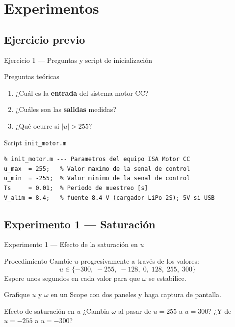 \documentclass{beamer}
\begin{document}
\section{Experimentos}

\subsection{Ejercicio previo}

\begin{frame}[fragile]{Ejercicio 1 --- Preguntas y script de inicialización}
\begin{block}{Preguntas teóricas}
  \begin{enumerate}
    \item ¿Cuál es la \textbf{entrada} del sistema motor CC?
    \item ¿Cuáles son las \textbf{salidas} medidas?
    \item ¿Qué ocurre si $|u| > 255$?
  \end{enumerate}
\end{block}
\vspace{4pt}
\begin{block}{Script \texttt{init\_motor.m}}
  \begin{lstlisting}
% init_motor.m --- Parametros del equipo ISA Motor CC
u_max  = 255;   % Valor maximo de la senal de control
u_min  = -255;  % Valor minimo de la senal de control
Ts     = 0.01;  % Periodo de muestreo [s]
V_alim = 8.4;   % fuente 8.4 V (cargador LiPo 2S); 5V si USB
\end{lstlisting}
\end{block}
\end{frame}

\subsection{Experimento 1 --- Saturación}

\begin{frame}{Experimento 1 --- Efecto de la saturación en $u$}
\begin{block}{Procedimiento}
  Cambie $u$ progresivamente a través de los valores:
  \[ u \in \{-300,\;-255,\;-128,\;0,\;128,\;255,\;300\} \]
  Espere unos segundos en cada valor para que $\omega$ se estabilice.
\end{block}
\vspace{4pt}
Grafique $u$ y $\omega$ en un Scope con dos paneles y haga captura de pantalla.
\begin{alertblock}{Efecto de saturación en $u$}
  ¿Cambia $\omega$ al pasar de $u=255$ a $u=300$?
  ¿Y de $u=-255$ a $u=-300$?
\end{alertblock}
\end{frame}
\end{document}
